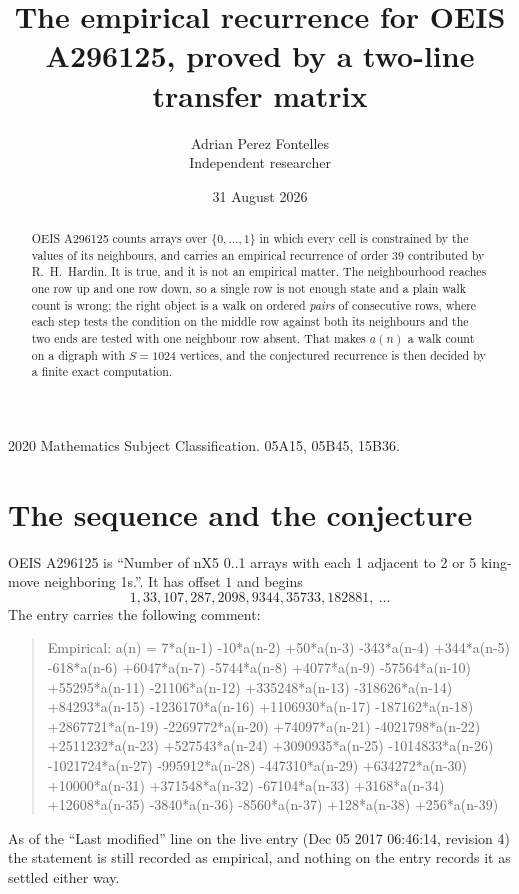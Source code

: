 \documentclass[11pt,a4paper]{article}
\title{The empirical recurrence for OEIS A296125, proved by a two-line transfer matrix}
\author{Adrian Perez Fontelles\\ \small Independent researcher}
\date{31 August 2026}
\theoremstyle{plain}
\theoremstyle{definition}
\begin{document}
\maketitle

\begin{abstract}
OEIS A296125 counts arrays over $\{0,\dots,1\}$ in which every cell is constrained by the
values of its neighbours, and carries an empirical recurrence of order $39$ contributed
by R.~H.~Hardin. It is true, and it is not an empirical matter. The neighbourhood reaches one
row up and one row down, so a single row is not enough state and a plain walk count
is wrong; the right object is a walk on ordered \emph{pairs} of consecutive rows, where
each step tests the condition on the middle row against both its neighbours and the two
ends are tested with one neighbour row absent. That makes $a(n)$ a walk count on a digraph
with $S=1024$ vertices, and the conjectured recurrence is then decided by a finite exact
computation.
\end{abstract}

\noindent\small 2020 Mathematics Subject Classification. 05A15, 05B45, 15B36.\normalsize

\section{The sequence and the conjecture}

OEIS A296125 is ``Number of nX5 0..1 arrays with each 1 adjacent to 2 or 5 king-move neighboring 1s.''. It has offset $1$ and begins
\[
1, 33, 107, 287, 2098, 9344, 35733, 182881,\ \dots
\]
The entry carries the following comment:
\begin{quote}\small
Empirical: a(n) = 7*a(n-1) -10*a(n-2) +50*a(n-3) -343*a(n-4) +344*a(n-5) -618*a(n-6) +6047*a(n-7) -5744*a(n-8) +4077*a(n-9) -57564*a(n-10) +55295*a(n-11) -21106*a(n-12) +335248*a(n-13) -318626*a(n-14) +84293*a(n-15) -1236170*a(n-16) +1106930*a(n-17) -187162*a(n-18) +2867721*a(n-19) -2269772*a(n-20) +74097*a(n-21) -4021798*a(n-22) +2511232*a(n-23) +527543*a(n-24) +3090935*a(n-25) -1014833*a(n-26) -1021724*a(n-27) -995912*a(n-28) -447310*a(n-29) +634272*a(n-30) +10000*a(n-31) +371548*a(n-32) -67104*a(n-33) +3168*a(n-34) +12608*a(n-35) -3840*a(n-36) -8560*a(n-37) +128*a(n-38) +256*a(n-39)
\end{quote}
As of the ``Last modified'' line on the live entry (Dec 05 2017 06:46:14, revision 4) the statement is
still recorded as empirical, and nothing on the entry records it as settled either way.
\end{document}

